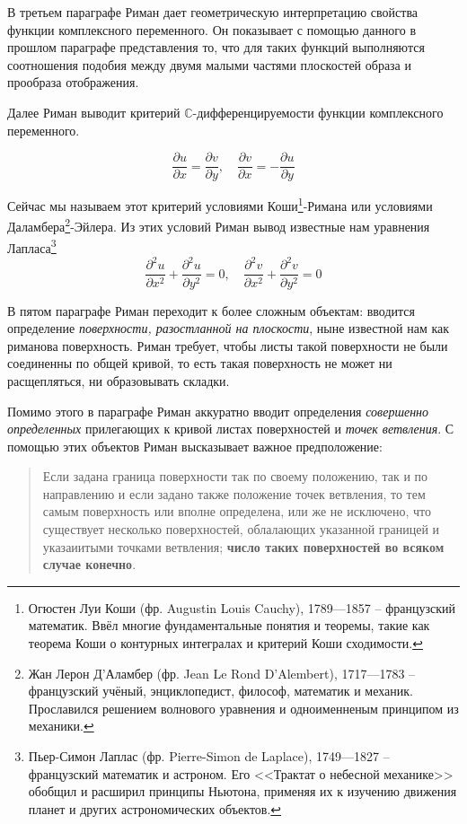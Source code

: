 \documentclass[a4paper,12pt]{article}
\def\C{\mathbb{C}}
\theoremstyle{remark}
\begin{document}
В третьем параграфе Риман дает геометрическую интерпретацию
свойства функции комплексного переменного. Он показывает с помощью
данного в прошлом параграфе представления то, что для
таких функций выполняются соотношения подобия между двумя
малыми частями плоскостей образа и прообраза отображения.

Далее Риман выводит критерий $\C$-дифференцируемости функции комплексного переменного.

\[\frac{\partial u}{\partial x} = \frac{\partial v}{\partial y}
  , \quad
  \frac{\partial v}{\partial x} = - \frac{\partial u}{\partial y} \]

Сейчас мы называем этот критерий условиями Коши\footnote{
  Огюстен Луи Коши (фр. Augustin Louis Cauchy), 1789—1857 --
  французский математик. Ввёл многие фундаментальные понятия
  и теоремы, такие как теорема Коши о контурных интегралах
  и критерий Коши сходимости.
}-Римана или условиями Даламбера\footnote{
  Жан Лерон Д’Аламбер (фр. Jean Le Rond D'Alembert), 1717—1783 --
  французский учёный, энциклопедист, философ, математик и механик.
  Прославился решением волнового уравнения и одноименненым принципом из механики.
}-Эйлера.
Из этих условий Риман вывод известные нам уравнения Лапласа\footnote{
  Пьер-Симон Лаплас (фр. Pierre-Simon de Laplace), 1749—1827 --
  французский математик и астроном. Его <<Трактат о небесной механике>> обобщил и расширил принципы Ньютона, применяя их
  к изучению движения планет и других астрономических объектов.
}
\[\frac{\partial^2 u}{\partial x^2} + \frac{\partial^2 u}{\partial y^2} = 0,\quad
  \frac{\partial^2 v}{\partial x^2} + \frac{\partial^2 v}{\partial y^2} = 0\]

В пятом параграфе Риман переходит к более сложным объектам:
вводится определение \textit{поверхности, разостланной
  на плоскости}, ныне известной нам как риманова поверхность.
Риман требует, чтобы листы такой поверхности не были соединенны по общей кривой,
то есть такая поверхность не может ни расщепляться, ни образовывать складки.

Помимо этого в параграфе Риман аккуратно вводит определения
\textit{совершенно определенных} прилегающих к кривой
листах поверхностей и \textit{точек ветвления}.
С помощью этих объектов Риман высказывает важное предположение:
\begin{quotation}
  Если задана граница поверхности так по своему положению, так и по направлению и если задано также положение точек ветвления,
  то тем самым поверхность или вполне определена,
  или же не исключено, что существует несколько поверхностей, облалающих указанной границей и указаиитыми точками ветвления;
  \textbf{число таких поверхностей во всяком случае конечно}.
\end{quotation}
\end{document}
